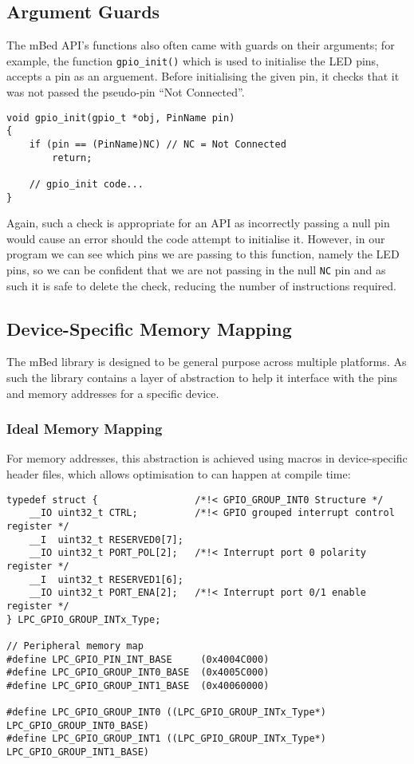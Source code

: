 \subsection{Argument Guards}

The mBed API's functions also often came with guards on their arguments; for example, the function \verb|gpio_init()| which is used to initialise the LED pins, accepts a pin as an arguement. Before initialising the given pin, it checks that it was not passed the pseudo-pin ``Not Connected''.

\begin{lstlisting}[caption={Argument Guards of gpio init}]
void gpio_init(gpio_t *obj, PinName pin)
{
    if (pin == (PinName)NC) // NC = Not Connected
        return;

    // gpio_init code...
}
\end{lstlisting}

Again, such a check is appropriate for an API as incorrectly passing a null pin would cause an error should the code attempt to initialise it. However, in our program we can see which pins we are passing to this function, namely the LED pins, so we can be confident that we are not passing in the null \verb|NC| pin and as such it is safe to delete the check, reducing the number of instructions required.

\subsection{Device-Specific Memory Mapping}

The mBed library is designed to be general purpose across multiple platforms. As such the library contains a layer of abstraction to help it interface with the pins and memory addresses for a specific device.

\subsubsection{Ideal Memory Mapping}

For memory addresses, this abstraction is achieved using macros in device-specific header files, which allows optimisation to can happen at compile time:

\begin{lstlisting}[caption={Memory spaces mapped in LPC11Uxx.h}]
typedef struct {                 /*!< GPIO_GROUP_INT0 Structure */
    __IO uint32_t CTRL;          /*!< GPIO grouped interrupt control register */
    __I  uint32_t RESERVED0[7];
    __IO uint32_t PORT_POL[2];   /*!< Interrupt port 0 polarity register */
    __I  uint32_t RESERVED1[6];
    __IO uint32_t PORT_ENA[2];   /*!< Interrupt port 0/1 enable register */
} LPC_GPIO_GROUP_INTx_Type;

// Peripheral memory map
#define LPC_GPIO_PIN_INT_BASE     (0x4004C000)
#define LPC_GPIO_GROUP_INT0_BASE  (0x4005C000)
#define LPC_GPIO_GROUP_INT1_BASE  (0x40060000)

#define LPC_GPIO_GROUP_INT0 ((LPC_GPIO_GROUP_INTx_Type*) LPC_GPIO_GROUP_INT0_BASE)
#define LPC_GPIO_GROUP_INT1 ((LPC_GPIO_GROUP_INTx_Type*) LPC_GPIO_GROUP_INT1_BASE)
\end{lstlisting}

